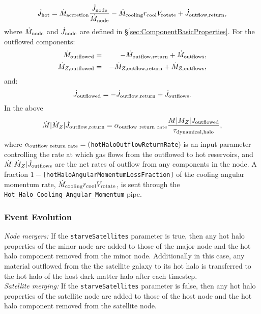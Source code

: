 \begin{equation}
 \dot{J}_{\rm hot} = \dot{M}_{\rm accretion} {\dot{J}_{\rm node} \over \dot{M}_{\rm node}} - \dot{M}_{\rm cooling} r_{\rm cool} V_{\rm rotate} + \dot{J}_{\rm outflow,return},
\end{equation}
where $\dot{M}_{\rm node}$ and $\dot{J}_{\rm node}$ are defined in \S\ref{sec:ComponentBasicProperties}. For the outflowed components:
\begin{eqnarray}
 \dot{M}_{\rm outflowed} &=& - \dot{M}_{\rm outflow,return} + \dot{M}_{\rm outflows}, \\
 \dot{M}_{Z, {\rm outflowed}} &=& - \dot{M}_{Z, {\rm outflow,return}} + \dot{M}_{Z, {\rm outflows}}, \\
\end{eqnarray}
and:
\begin{equation}
 \dot{J}_{\rm outflowed} = - \dot{J}_{\rm outflow,return} + \dot{J}_{\rm outflows}.
\end{equation}
In the above
\begin{equation}
 \dot{M}|\dot{M}_Z|\dot{J}_{\rm outflow,return} = \alpha_{\rm outflow~return~rate} {M|M_Z|J_{\rm outflowed}\over \tau_{\rm dynamical, halo}},
\end{equation}
where $\alpha_{\rm outflow~return~rate}=(${\tt hotHaloOutflowReturnRate}) is an input parameter controlling the rate at which gas flows from the outflowed to hot reservoirs, and $\dot{M}|\dot{M}_Z|\dot{J}_{\rm outflows}$ are the net rates of outflow from any components in the node. A fraction $1-${\tt [hotHaloAngularMomentumLossFraction]} of the cooling angular momentum rate, $\dot{M}_{\rm cooling} r_{\rm cool} V_{\rm rotate}$, is sent through the {\tt Hot\_Halo\_Cooling\_Angular\_Momentum} pipe.

\subsubsection{Event Evolution}

\noindent\emph{Node mergers:} If the {\tt starveSatellites} parameter is true, then any hot halo properties of the minor node are added to those of the major node and the hot halo component removed from the minor node. Additionally in this case, any material outflowed from the the satellite galaxy to its hot halo is transferred to the hot halo of the host dark matter halo after each timestep.\\

\noindent\emph{Satellite merging:} If the {\tt starveSatellites} parameter is false, then any hot halo properties of the satellite node are added to those of the host node and the hot halo component removed from the satellite node.\\

